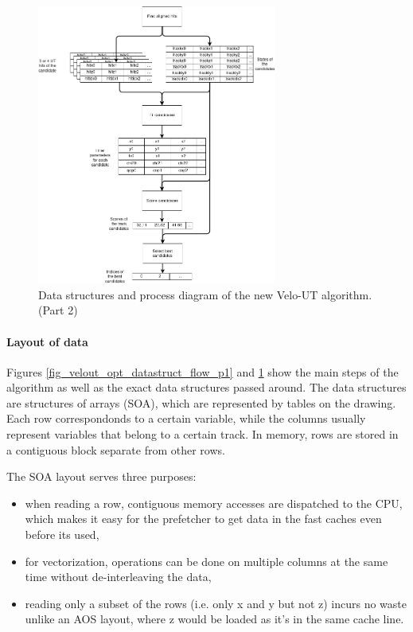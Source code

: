 \documentclass[12pt]{article}
\begin{document}
\begin{figure}[H]
	\begin{center}
		\includegraphics[width=0.7\textwidth]{velout_opt_datastruct_flow_p2}
	\end{center}
	\caption{Data structures and process diagram of the new Velo-UT algorithm. (Part 2)}
	\label{fig_velout_opt_datastruct_flow_p2}
\end{figure}

\paragraph{Layout of data} \mbox{}\vspace{0.4pc}

Figures \ref{fig_velout_opt_datastruct_flow_p1} and \ref{fig_velout_opt_datastruct_flow_p2} show the main steps of the algorithm as well as the exact data structures passed around. The data structures are structures of arrays (SOA), which are represented by tables on the drawing. Each row correspondonds to a certain variable, while the columns usually represent variables that belong to a certain track. In memory, rows are stored in a contiguous block separate from other rows.

The SOA layout serves three purposes:
\begin{itemize}
	\item when reading a row, contiguous memory accesses are dispatched to the CPU, which makes it easy for the prefetcher to get data in the fast caches even before its used,
	\item for vectorization, operations can be done on multiple columns at the same time without de-interleaving the data,
	\item reading only a subset of the rows (i.e. only x and y but not z) incurs no waste unlike an AOS layout, where z would be loaded as it's in the same cache line.
\end{itemize}
\end{document}
